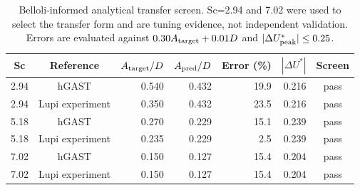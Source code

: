 \begin{table}[t]
\centering
\caption{Belloli-informed analytical transfer screen. Sc=2.94 and 7.02 were used to select the transfer form and are tuning evidence, not independent validation. Errors are evaluated against $0.30A_{\rm target}+0.01D$ and $|\Delta U^*_{\rm peak}|\leq0.25$.}
\label{tab:belloli-sc-transfer-screen}
\begin{tabular}{ccrrrrc}
\hline
Sc & Reference & $A_{\rm target}/D$ & $A_{\rm pred}/D$ & Error (\%) & $|\Delta U^*|$ & Screen \\
\hline
2.94 & hGAST & 0.540 & 0.432 & 19.9 & 0.216 & pass \\
2.94 & Lupi experiment & 0.350 & 0.432 & 23.5 & 0.216 & pass \\
5.18 & hGAST & 0.270 & 0.229 & 15.1 & 0.239 & pass \\
5.18 & Lupi experiment & 0.235 & 0.229 & 2.5 & 0.239 & pass \\
7.02 & hGAST & 0.150 & 0.127 & 15.4 & 0.204 & pass \\
7.02 & Lupi experiment & 0.150 & 0.127 & 15.4 & 0.204 & pass \\
\hline
\end{tabular}
\end{table}
